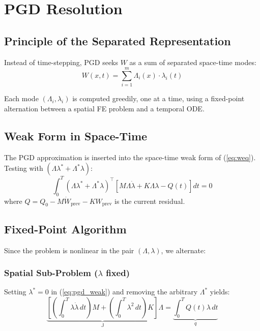 \documentclass[11pt,a4paper]{article}
\begin{document}
\section{PGD Resolution}

\subsection{Principle of the Separated Representation}

Instead of time-stepping, PGD seeks $W$ as a sum of separated space-time modes:
\begin{equation}
    W(x,t) = \sum_{i=1}^{m} \Lambda_i(x)\cdot\lambda_i(t)
    \label{eq:pgd_sep}
\end{equation}

Each mode $(\Lambda_i, \lambda_i)$ is computed greedily, one at a time, using a fixed-point alternation between a spatial FE problem and a temporal ODE.

\subsection{Weak Form in Space-Time}

The PGD approximation is inserted into the space-time weak form of (\ref{eq:weq}). Testing with $(\Lambda\lambda^* + \Lambda^*\lambda)$:
\begin{equation}
    \int_0^T (\Lambda\lambda^* + \Lambda^*\lambda)^\top \left[M\Lambda\dot{\lambda} + K\Lambda\lambda - Q(t)\right]dt = 0
    \label{eq:pgd_weak}
\end{equation}
where $Q = Q_0 - M\dot{W}_{\text{prev}} - KW_{\text{prev}}$ is the current residual.

\subsection{Fixed-Point Algorithm}

Since the problem is nonlinear in the pair $(\Lambda, \lambda)$, we alternate:

\subsubsection{Spatial Sub-Problem ($\lambda$ fixed)}

Setting $\lambda^* = 0$ in (\ref{eq:pgd_weak}) and removing the arbitrary $\Lambda^*$ yields:
\begin{equation}
    \underbrace{\left[\left(\int_0^T \lambda\dot{\lambda}\,dt\right)M + \left(\int_0^T \lambda^2\,dt\right)K\right]}_{\mathbb{J}} \Lambda = \underbrace{\int_0^T Q(t)\lambda\,dt}_{q}
    \label{eq:fe_problem}
\end{equation}
\end{document}
